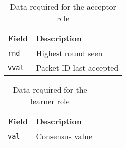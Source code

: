 \begin{table}[H]
\begin{tabular}{|l|l|}
\hline \textbf{Field} & \textbf{Description} \\
\hline \texttt{rnd} & Highest round seen \\
\hline \texttt{vval} & Packet ID last accepted \\
\hline
\end{tabular}
\caption{Data required for the acceptor role}
\label{paxos.acceptor.fields}
\end{table}

\begin{table}[H]
\begin{tabular}{|l|l|}
\hline \textbf{Field} & \textbf{Description} \\
\hline \texttt{val} & Consensus value \\
\hline
\end{tabular}
\caption{Data required for the learner role}
\label{paxos.learner.fields}
\end{table}
